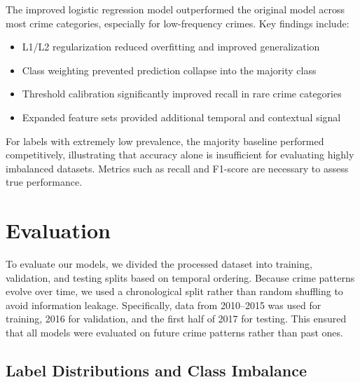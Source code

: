 \documentclass[11pt]{article}
\begin{document}
The improved logistic regression model outperformed the original model across most crime categories, especially for low-frequency crimes. Key findings include:

\begin{itemize}
    \item L1/L2 regularization reduced overfitting and improved generalization
    \item Class weighting prevented prediction collapse into the majority class
    \item Threshold calibration significantly improved recall in rare crime categories
    \item Expanded feature sets provided additional temporal and contextual signal
\end{itemize}

For labels with extremely low prevalence, the majority baseline performed competitively, illustrating that accuracy alone is insufficient for evaluating highly imbalanced datasets. Metrics such as recall and F1-score are necessary to assess true performance.


\section{Evaluation}

To evaluate our models, we divided the processed dataset into training, validation, and testing splits based on temporal ordering. Because crime patterns evolve over time, we used a chronological split rather than random shuffling to avoid information leakage. Specifically, data from 2010--2015 was used for training, 2016 for validation, and the first half of 2017 for testing. This ensured that all models were evaluated on future crime patterns rather than past ones.

\subsection{Label Distributions and Class Imbalance}
\end{document}
